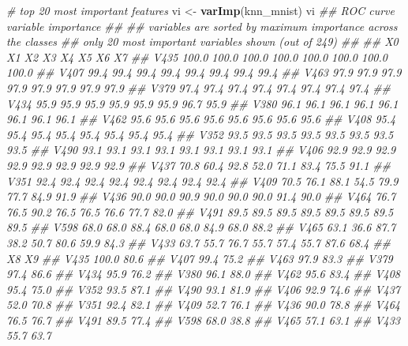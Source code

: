\documentclass[]{krantz}
\makeatletter
\newenvironment{Shaded}{\begin{snugshade}}{\end{snugshade}}
\newcommand{\CommentTok}[1]{\textcolor[rgb]{0.37,0.37,0.37}{\textit{#1}}}
\newcommand{\KeywordTok}[1]{\textcolor[rgb]{0.27,0.27,0.27}{\textbf{#1}}}
\newcommand{\NormalTok}[1]{#1}
\newcommand{\StringTok}[1]{\textcolor[rgb]{0.5,0.5,0.5}{#1}}
\newenvironment{kframe}{%
\medskip{}
\setlength{\fboxsep}{.8em}
 \def\at@end@of@kframe{}%
 \ifinner\ifhmode%
  \def\at@end@of@kframe{\end{minipage}}%
  \begin{minipage}{\columnwidth}%
 \fi\fi%
 \def\FrameCommand##1{\hskip\@totalleftmargin \hskip-\fboxsep
 \colorbox{shadecolor}{##1}\hskip-\fboxsep
     \hskip-\linewidth \hskip-\@totalleftmargin \hskip\columnwidth}%
 \MakeFramed {\advance\hsize-\width
   \@totalleftmargin\z@ \linewidth\hsize
   \@setminipage}}%
 {\par\unskip\endMakeFramed%
 \at@end@of@kframe}
\renewenvironment{Shaded}{\begin{kframe}}{\end{kframe}}
\makeatother
\begin{document}
\begin{Shaded}
\begin{Highlighting}[]
\CommentTok{# top 20 most important features}
\NormalTok{vi <-}\StringTok{ }\KeywordTok{varImp}\NormalTok{(knn_mnist)}
\NormalTok{vi}
\CommentTok{## ROC curve variable importance}
\CommentTok{## }
\CommentTok{##   variables are sorted by maximum importance across the classes}
\CommentTok{##   only 20 most important variables shown (out of 249)}
\CommentTok{## }
\CommentTok{##         X0    X1    X2    X3    X4    X5    X6    X7}
\CommentTok{## V435 100.0 100.0 100.0 100.0 100.0 100.0 100.0 100.0}
\CommentTok{## V407  99.4  99.4  99.4  99.4  99.4  99.4  99.4  99.4}
\CommentTok{## V463  97.9  97.9  97.9  97.9  97.9  97.9  97.9  97.9}
\CommentTok{## V379  97.4  97.4  97.4  97.4  97.4  97.4  97.4  97.4}
\CommentTok{## V434  95.9  95.9  95.9  95.9  95.9  95.9  96.7  95.9}
\CommentTok{## V380  96.1  96.1  96.1  96.1  96.1  96.1  96.1  96.1}
\CommentTok{## V462  95.6  95.6  95.6  95.6  95.6  95.6  95.6  95.6}
\CommentTok{## V408  95.4  95.4  95.4  95.4  95.4  95.4  95.4  95.4}
\CommentTok{## V352  93.5  93.5  93.5  93.5  93.5  93.5  93.5  93.5}
\CommentTok{## V490  93.1  93.1  93.1  93.1  93.1  93.1  93.1  93.1}
\CommentTok{## V406  92.9  92.9  92.9  92.9  92.9  92.9  92.9  92.9}
\CommentTok{## V437  70.8  60.4  92.8  52.0  71.1  83.4  75.5  91.1}
\CommentTok{## V351  92.4  92.4  92.4  92.4  92.4  92.4  92.4  92.4}
\CommentTok{## V409  70.5  76.1  88.1  54.5  79.9  77.7  84.9  91.9}
\CommentTok{## V436  90.0  90.0  90.9  90.0  90.0  90.0  91.4  90.0}
\CommentTok{## V464  76.7  76.5  90.2  76.5  76.5  76.6  77.7  82.0}
\CommentTok{## V491  89.5  89.5  89.5  89.5  89.5  89.5  89.5  89.5}
\CommentTok{## V598  68.0  68.0  88.4  68.0  68.0  84.9  68.0  88.2}
\CommentTok{## V465  63.1  36.6  87.7  38.2  50.7  80.6  59.9  84.3}
\CommentTok{## V433  63.7  55.7  76.7  55.7  57.4  55.7  87.6  68.4}
\CommentTok{##         X8   X9}
\CommentTok{## V435 100.0 80.6}
\CommentTok{## V407  99.4 75.2}
\CommentTok{## V463  97.9 83.3}
\CommentTok{## V379  97.4 86.6}
\CommentTok{## V434  95.9 76.2}
\CommentTok{## V380  96.1 88.0}
\CommentTok{## V462  95.6 83.4}
\CommentTok{## V408  95.4 75.0}
\CommentTok{## V352  93.5 87.1}
\CommentTok{## V490  93.1 81.9}
\CommentTok{## V406  92.9 74.6}
\CommentTok{## V437  52.0 70.8}
\CommentTok{## V351  92.4 82.1}
\CommentTok{## V409  52.7 76.1}
\CommentTok{## V436  90.0 78.8}
\CommentTok{## V464  76.5 76.7}
\CommentTok{## V491  89.5 77.4}
\CommentTok{## V598  68.0 38.8}
\CommentTok{## V465  57.1 63.1}
\CommentTok{## V433  55.7 63.7}
\end{Highlighting}
\end{Shaded}
\end{document}
